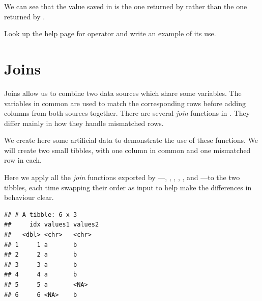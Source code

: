 \documentclass[krantz2]{krantz}\usepackage{knitr}%
\begin{document}
We can see that the value saved in  is the one returned by  rather than the one returned by .

\begin{playground}
Look up the help page for operator \Roperator{\%\$\%} and write an example of its use.
\end{playground}

\section{Joins}

Joins allow us to combine two data sources which share some variables. The variables in common are used to match the corresponding rows before adding columns from both sources together. There are several \emph{join} functions in . They differ mainly in how they handle mismatched rows.

We create here some artificial data to demonstrate the use of these functions. We will create two small tibbles, with one column in common and one mismatched row in each.

\begin{knitrout}\footnotesize
{}\color{fgcolor}\begin{kframe}
\begin{alltt}
 \hlkwb{<-} \hlstd{(} \hlstd{=} \hlstd{(}\hlopt{:}\hlstd{,} \hlstd{),}  \hlstd{=} \hlstd{)}
 \hlkwb{<-} \hlstd{(} \hlstd{=} \hlstd{(}\hlopt{:}\hlstd{,} \hlstd{),}  \hlstd{=} \hlstd{)}
\end{alltt}
\end{kframe}
\end{knitrout}

Here we apply all the \emph{join} functions exported by ---, , , , , and ---to the two tibbles, each time swapping their order as input to help make the differences in behaviour clear.

\begin{knitrout}\footnotesize
{}\color{fgcolor}\begin{kframe}
\begin{alltt}
\end{alltt}


{\ttfamily\noindent\itshape{}}\begin{verbatim}
## # A tibble: 6 x 3
##     idx values1 values2
##   <dbl> <chr>   <chr>  
## 1     1 a       b      
## 2     2 a       b      
## 3     3 a       b      
## 4     4 a       b      
## 5     5 a       <NA>   
## 6     6 <NA>    b
\end{verbatim}
\end{kframe}
\end{knitrout}
\end{document}
